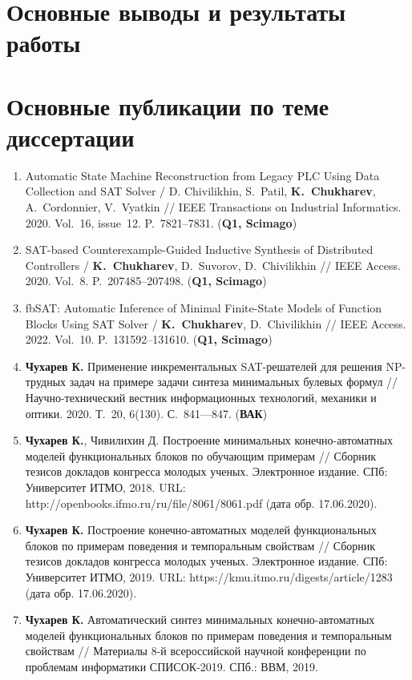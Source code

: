 \section*{Основные выводы и результаты работы}

\todo{}


\section*{Основные публикации по теме диссертации}

\begin{enumerate}[left=0pt]
    \item Automatic State Machine Reconstruction from Legacy PLC Using Data Collection and SAT Solver / D. Chivilikhin, S.~Patil, \textbf{K.~Chukharev}, A.~Cordonnier, V.~Vyatkin // IEEE Transactions on Industrial Informatics. 2020. Vol.~16, issue~12. P.~7821–7831. (\textbf{Q1, Scimago})
    \item SAT-based Counterexample-Guided Inductive Synthesis of Distributed Controllers / \textbf{K.~Chukharev}, D.~Suvorov, D.~Chivilikhin // IEEE Access. 2020. Vol.~8. P.~207485–207498. (\textbf{Q1, Scimago})
    \item fbSAT: Automatic Inference of Minimal Finite-State Models of Function Blocks Using SAT Solver / \textbf{K.~Chukharev}, D.~Chivilikhin // IEEE Access. 2022. Vol.~10. P.~131592–131610. (\textbf{Q1, Scimago})
    \item \textbf{Чухарев К.} Применение инкрементальных SAT-решателей для решения NP-трудных задач на примере задачи синтеза минимальных булевых формул // Научно-технический вестник информационных технологий, механики и оптики. 2020. Т.~20, 6(130). С.~841—847. (\textbf{ВАК})
    \item \textbf{Чухарев К.}, Чивилихин Д. Построение минимальных конечно-автоматных моделей функциональных блоков по обучающим примерам // Сборник тезисов докладов конгресса молодых ученых. Электронное издание. СПб: Университет ИТМО, 2018. URL: http://openbooks.ifmo.ru/ru/file/8061/8061.pdf (дата обр. 17.06.2020).
    \item \textbf{Чухарев К.} Построение конечно-автоматных моделей функциональных блоков по примерам поведения и темпоральным свойствам // Сборник тезисов докладов конгресса молодых ученых. Электронное издание. СПб: Университет ИТМО, 2019. URL: https://kmu.itmo.ru/digests/article/1283 (дата обр. 17.06.2020).
    \item \textbf{Чухарев К.} Автоматический синтез минимальных конечно-автоматных моделей функциональных блоков по примерам поведения и темпоральным свойствам // Материалы 8-й всероссийской научной конференции по проблемам информатики СПИСОК-2019. СПб.: ВВМ, 2019.

\end{enumerate}
